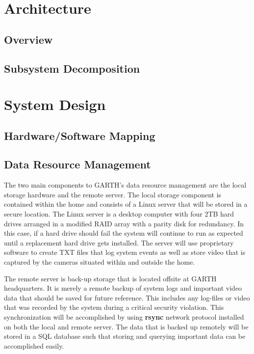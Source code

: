 \documentclass{report}
\begin{document}
\chapter{Architecture} %
\label{ch:architecture}

\section{Overview}

\section{Subsystem Decomposition}

\chapter{System Design} %
\label{ch:system-design}

\section{Hardware/Software Mapping}

\section{Data Resource Management}

The two main components to GARTH's data resource management are the local storage
hardware and the remote server. The local storage component is contained within the
home and consists of a Linux server that will be stored in a secure location. The Linux server
is a desktop computer with four 2TB hard drives arranged in a modified RAID array with a
parity disk for redundancy. In this case, if a hard drive should fail the system will continue
to run as expected until a replacement hard drive gets installed. The server will use proprietary 
software  to create TXT files that log system events as well as store video that is captured by the 
cameras situated within and outside the home.

The remote server is back-up storage that is located offsite at GARTH headquarters. It is
merely a remote backup of system logs and important video data that should be saved for
future reference. This includes any log-files or video that was recorded by the system during a 
critical security violation. This synchronization will be accomplished by using \textbf{rsync} 
network protocol installed on both the local and remote server. The data that is backed up
remotely will be stored in a SQL database such that storing and querying important data
can be accomplished easily.
\end{document}
